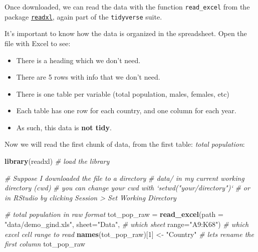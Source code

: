\documentclass[]{book}
\newenvironment{Shaded}{\begin{snugshade}}{\end{snugshade}}
\newcommand{\KeywordTok}[1]{\textcolor[rgb]{0.13,0.29,0.53}{\textbf{#1}}}
\newcommand{\DataTypeTok}[1]{\textcolor[rgb]{0.13,0.29,0.53}{#1}}
\newcommand{\DecValTok}[1]{\textcolor[rgb]{0.00,0.00,0.81}{#1}}
\newcommand{\StringTok}[1]{\textcolor[rgb]{0.31,0.60,0.02}{#1}}
\newcommand{\CommentTok}[1]{\textcolor[rgb]{0.56,0.35,0.01}{\textit{#1}}}
\newcommand{\NormalTok}[1]{#1}
\providecommand{\tightlist}{%
  \setlength{\itemsep}{0pt}\setlength{\parskip}{0pt}}
\theoremstyle{definition}
\theoremstyle{definition}
\theoremstyle{definition}
\theoremstyle{remark}
\begin{document}
Once downloaded, we can read the data with the function
\texttt{read\_excel} from the package
\href{http://readxl.tidyverse.org}{\texttt{readxl}}, again part of the
\texttt{tidyverse} suite.

It's important to know how the data is organized in the spreadsheet.
Open the file with Excel to see:

\begin{itemize}
\tightlist
\item
  There is a heading which we don't need.
\item
  There are 5 rows with info that we don't need.
\item
  There is one table per variable (total population, males, females,
  etc)
\item
  Each table has one row for each country, and one column for each year.
\item
  As such, this data is \textbf{not tidy}.
\end{itemize}

Now we will read the first chunk of data, from the first table:
\emph{total population}:

\begin{Shaded}
\begin{Highlighting}[]
\KeywordTok{library}\NormalTok{(readxl)  }\CommentTok{# load the library}

\CommentTok{# Suppose I downloaded the file to a directory }
\CommentTok{# data/ in my current working directory (cwd)}
\CommentTok{# you can change your cwd with `setwd("your/directory")`}
\CommentTok{# or in RStudio by clicking Session > Set Working Directory}

\CommentTok{# total population in raw format}
\NormalTok{tot_pop_raw =}\StringTok{ }\KeywordTok{read_excel}\NormalTok{(}\DataTypeTok{path =} \StringTok{"data/demo_gind.xls"}\NormalTok{, }
                \DataTypeTok{sheet=}\StringTok{"Data"}\NormalTok{, }\CommentTok{# which sheet}
                \DataTypeTok{range=}\StringTok{"A9:K68"}\NormalTok{)  }\CommentTok{# which excel cell range to read}
\KeywordTok{names}\NormalTok{(tot_pop_raw)[}\DecValTok{1}\NormalTok{] <-}\StringTok{ "Country"}   \CommentTok{# lets rename the first column}
\NormalTok{tot_pop_raw}
\end{Highlighting}
\end{Shaded}
\end{document}
